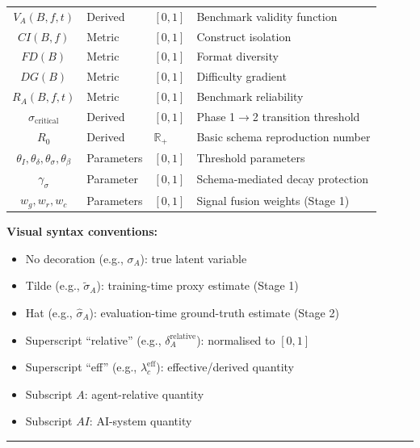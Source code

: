 \documentclass[11pt,a4paper]{article}
\newcommand{\R}{\mathbb{R}}
\begin{document}
\begin{center}
{\begin{tabular}{c l l l}
$V_A(B,f,t)$ & Derived & $[0,1]$ & Benchmark validity function \\
$CI(B,f)$ & Metric & $[0,1]$ & Construct isolation \\
$FD(B)$ & Metric & $[0,1]$ & Format diversity \\
$DG(B)$ & Metric & $[0,1]$ & Difficulty gradient \\
$R_A(B,f,t)$ & Metric & $[0,1]$ & Benchmark reliability \\
$\sigma_{\text{critical}}$ & Derived & $[0,1]$ & Phase 1$\to$2 transition threshold \\
$R_0$ & Derived & $\R_+$ & Basic schema reproduction number \\
$\theta_I, \theta_\delta, \theta_\sigma, \theta_\beta$ & Parameters & $[0,1]$ & Threshold parameters \\
$\gamma_\sigma$ & Parameter & $[0,1]$ & Schema-mediated decay protection \\
$w_g, w_r, w_c$ & Parameters & $[0,1]$ & Signal fusion weights (Stage 1) \\
\bottomrule
\end{tabular}%
}
\end{center}

\textbf{Visual syntax conventions:}
\begin{itemize}[nosep]
\item No decoration (e.g., $\sigma_A$): true latent variable
\item Tilde (e.g., $\tilde{\sigma}_A$): training-time proxy estimate (Stage 1)
\item Hat (e.g., $\hat{\sigma}_A$): evaluation-time ground-truth estimate (Stage 2)
\item Superscript ``relative'' (e.g., $\delta_A^{\text{relative}}$): normalised to $[0,1]$
\item Superscript ``eff'' (e.g., $\lambda_c^{\text{eff}}$): effective/derived quantity
\item Subscript $A$: agent-relative quantity
\item Subscript $AI$: AI-system quantity
\end{itemize}

\noindent\rule{\linewidth}{0.4pt}



\end{document}
